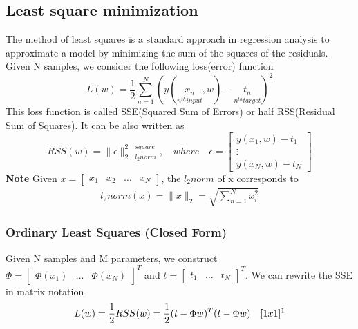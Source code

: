 \documentclass[main.tex]{subfiles}
\begin{document}
\subsection{Least square minimization}
The method of least squares is a standard approach in regression analysis to approximate a model by minimizing the sum of the squares of the residuals. Given N samples, we consider the following loss(error) function
\begin{equation}
    L(w)=\frac{1}{2}\sum_{n=1}^N(y(\underset{n^{th}input}{x_n},w)-\underset{n^{th}target}{t_n})^2
\end{equation}
This loss function is called SSE(Squared Sum of Errors) or half RSS(Residual Sum of Squares). It can be also written as
\begin{equation}
    RSS(w)=\|\epsilon\|_{2\quad l_2norm}^{2\quad square},\quad where \quad \epsilon=\begin{bmatrix}y(x_1,w)-t_1\\ \vdots \\ y(x_N,w)-t_N\end{bmatrix}
\end{equation}
\textbf{Note} Given $x=\begin{bmatrix}x_1 & x_2 & \dots & x_{N}\end{bmatrix}$, the $l_2 norm$ of x corresponds to
\begin{align}
    l_2norm(x) = \|x\|_{2} = \sqrt{\sum_{n=1}^{N} x_i^2}
\end{align}

\newpage
\subsubsection{Ordinary Least Squares (Closed Form)}
Given N samples and M parameters, we construct $\Phi=\begin{bmatrix}\Phi(x_1) & \dots & \Phi(x_N)\end{bmatrix}^T$ and $t=\begin{bmatrix}t_1 & \dots & t_N\end{bmatrix}^T$.
\newline
We can rewrite the SSE in matrix notation
\begin{equation}
    L(w) = \frac{1}{2}RSS(w)=\frac{1}{2}(t-\Phi w)^T(t-\Phi w) \quad [1x1]\footnotemark
\end{equation}
\end{document}
